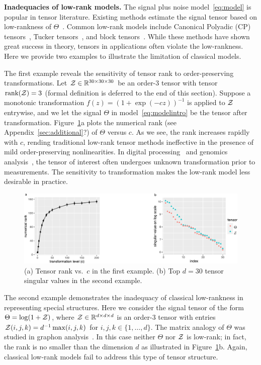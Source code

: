 \documentclass{article}
\theoremstyle{plain}
\theoremstyle{definition}
\begin{document}
{\bf Inadequacies of  low-rank models.} The signal plus noise model~\eqref{eq:model} is popular in tensor literature. Existing methods estimate the signal tensor based on low-rankness of $\Theta$~\citep{jain2014provable,montanari2018spectral}. Common low-rank models include Canonical Polyadic (CP) tensors~\citep{hitchcock1927expression}, Tucker tensors~\citep{de2000multilinear}, and block tensors~\citep{wang2019multiway}. While these methods have shown great success in theory, tensors in applications often violate the low-rankness. Here we provide two examples to illustrate the limitation of classical models.


The first example reveals the sensitivity of tensor rank to order-preserving transformations. Let $\mathcal{Z} \in \mathbb{R}^{30\times 30\times 30}$ be an order-3 tensor with tensor $\text{rank}(\mathcal{Z})=3$ (formal definition is deferred to the end of this section). Suppose a monotonic transformation $f(z)=(1+\exp(-cz))^{-1}$ is applied to $\mathcal{Z}$ entrywise, and we let the signal $\Theta$ in model~\eqref{eq:modelintro} be the tensor after transformation. Figure~\ref{fig:example}a plots the numerical rank (see Appendix~\ref{sec:additional}{\color{red}?}) of $\Theta$ versus $c$. As we see, the rank increases rapidly with $c$, rending traditional low-rank tensor methods ineffective in the presence of mild order-preserving nonlinearities. In  digital processing~\citep{ghadermarzy2018learning} and genomics analysis~\citep{hore2016tensor}, the tensor of interest often undergoes unknown transformation prior to measurements. The sensitivity to transformation makes the low-rank model less desirable in practice. 

\begin{figure}[h]
\captionsetup{font=footnotesize}
\centering
\vspace{-.2cm}
\includegraphics[width=.65\textwidth]{figure/example_comb2.pdf}
\vspace{-.1cm}
\caption{(a) Tensor rank vs.\ $c$ in the first example. (b) Top $d=30$ tensor singular values in the second example. }
\vspace{-.2cm}
\label{fig:example}
\end{figure}

The second example demonstrates the inadequacy of classical low-rankness in representing special structures. Here we consider the signal tensor of the form $\Theta=\log(1+\mathcal{Z})$, where $\mathcal{Z}\in\mathbb{R}^{d\times d\times d}$ is an order-3 tensor with entries $\mathcal{Z}(i,j,k)=d^{-1}\max(i,j,k)$ for $i,j,k\in\{1,\ldots,d\}$. The matrix analogy of $\Theta$ was studied in graphon analysis~\cite{chan2014consistent}. In this case neither $\Theta$ nor $\mathcal{Z}$ is low-rank; in fact, the rank is no smaller than the dimension $d$ as illustrated in Figure~\ref{fig:example}b. Again, classical low-rank models fail to address this type of tensor structure. 
\end{document}
